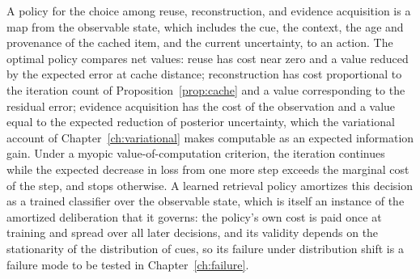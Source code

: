 A policy for the choice among reuse, reconstruction, and evidence acquisition is a map from the observable state, which includes the cue, the context, the age and provenance of the cached item, and the current uncertainty, to an action. The optimal policy compares net values: reuse has cost near zero and a value reduced by the expected error at cache distance; reconstruction has cost proportional to the iteration count of Proposition~\ref{prop:cache} and a value corresponding to the residual error; evidence acquisition has the cost of the observation and a value equal to the expected reduction of posterior uncertainty, which the variational account of Chapter~\ref{ch:variational} makes computable as an expected information gain. Under a myopic value-of-computation criterion, the iteration continues while the expected decrease in loss from one more step exceeds the marginal cost of the step, and stops otherwise. A learned retrieval policy amortizes this decision as a trained classifier over the observable state, which is itself an instance of the amortized deliberation that it governs: the policy's own cost is paid once at training and spread over all later decisions, and its validity depends on the stationarity of the distribution of cues, so its failure under distribution shift is a failure mode to be tested in Chapter~\ref{ch:failure}.
